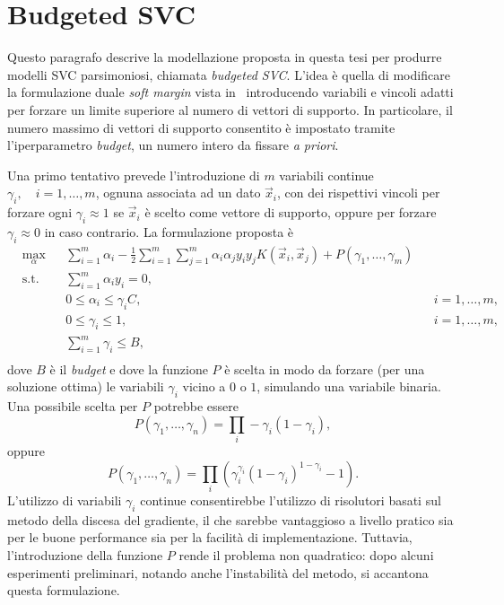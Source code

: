 \section{Budgeted SVC}\label{sec:our_budgeted_svm}
Questo paragrafo descrive la modellazione proposta in questa tesi per produrre modelli SVC parsimoniosi, chiamata \emph{budgeted SVC}.
L'idea è quella di modificare la formulazione duale \emph{soft margin} vista in~ introducendo variabili e vincoli adatti per forzare un limite superiore al numero di vettori di supporto.
In particolare, il numero massimo di vettori di supporto consentito è impostato tramite l'iperparametro \emph{budget}, un numero intero da fissare \emph{a priori}.

Una primo tentativo prevede l'introduzione di $m$ variabili continue $\gamma_i,\quad i=1,\dots,m$, ognuna associata ad un dato $\Vec{x}_i$, con dei rispettivi vincoli per forzare ogni $\gamma_i\approx1$ se $\Vec{x}_i$ è scelto come vettore di supporto, oppure per forzare $\gamma_i\approx0$ in caso contrario.
La formulazione proposta è 
\begin{equation}\label{eq:budget_svc:continuous_gamma_formulation}
\begin{aligned}
& \max_{\alpha}    && \sum_{i=1}^{m}\alpha_i - \frac{1}{2}\sum_{i=1}^{m}\sum_{j=1}^{m}\alpha_i\alpha_jy_iy_jK(\Vec{x}_i, \Vec{x}_j) +P(\gamma_1, \dots, \gamma_m)\\
& \textrm{s.t.} && \sum_{i=1}^{m} \alpha_iy_i = 0,                   \\
&               && 0 \leq \alpha_i \leq \gamma_iC,   && i=1,\dots,m,  \\
&               && 0 \leq \gamma_i \leq 1,           && i=1, \dots,m,\\
&               && \sum_{i=1}^{m} \gamma_i \leq B,                   \\
\end{aligned}
\end{equation}
dove $B$ è il \emph{budget} e dove la funzione $P$ è scelta in modo da forzare (per una soluzione ottima) le variabili $\gamma_i$ vicino a $0$ o $1$, simulando una variabile binaria.
Una possibile scelta per $P$ potrebbe essere 
$$P(\gamma_1, \dots, \gamma_n) = \prod_i -\gamma_i (1 - \gamma_i),$$
oppure 
$$P(\gamma_1, \dots, \gamma_n) = \prod_i \left( \gamma_i^{\gamma_i} (1 - \gamma_i)^{1 - \gamma_i} - 1 \right).$$
%
%
L'utilizzo di variabili $\gamma_i$ continue consentirebbe l'utilizzo di risolutori basati sul metodo della discesa del gradiente, il che sarebbe vantaggioso a livello pratico sia per le buone performance sia per la facilità di implementazione. 
Tuttavia, l'introduzione della funzione $P$ rende il problema non quadratico: dopo alcuni esperimenti preliminari, notando anche l'instabilità del metodo, si accantona questa formulazione.

